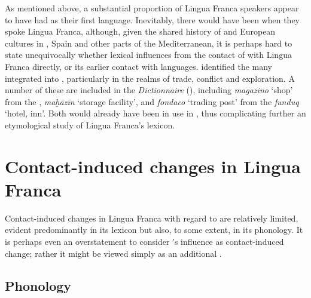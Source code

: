 \documentclass[output=paper]{langsci/langscibook}
\begin{document}
	As mentioned above, a substantial proportion of Lingua Franca speakers appear to have had  as their first language. Inevitably, there would have been  when they spoke Lingua Franca, although, given the shared history of  and European cultures in , Spain and other parts of the Mediterranean, it is perhaps hard to state unequivocally whether lexical influences  from the contact of  with Lingua Franca directly, or its earlier contact with  languages. \citet{Pellegrini1972} identified the many   integrated into , particularly in the realms of trade, conflict and exploration. A number of these are included in the \textit{Dictionnaire} (\citeyear{Anonymous1830}), including \textit{magazino} ‘shop’ from the , \textit{maḫāzīn} ‘storage facility’, and \textit{fondaco} ‘trading post’ from the  \textit{funduq} ‘hotel, inn’. Both would already have been in use in , thus complicating further an etymological study of Lingua Franca’s lexicon.
	

\section{Contact-induced changes in Lingua Franca}
	
	Contact-induced changes in Lingua Franca with regard to  are relatively limited, evident predominantly in its lexicon but also, to some extent, in its phonology. It is perhaps even an overstatement to consider ’s influence as contact-induced change; rather it might be viewed simply as an additional .
	
\subsection{Phonology}
	
\end{document}
